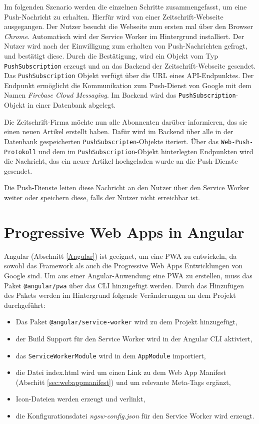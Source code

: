 Im folgenden Szenario werden die einzelnen Schritte zusammengefasst, um eine Push-Nachricht zu erhalten. Hierfür wird von einer Zeitschrift-Webseite ausgegangen. Der Nutzer besucht die Webseite zum ersten mal über den Browser \textit{Chrome}. Automatisch wird der Service Worker im Hintergrund installiert. Der Nutzer wird nach der Einwilligung zum erhalten von Push-Nachrichten gefragt, und bestätigt diese. Durch die Bestätigung, wird ein Objekt vom Typ \texttt{PushSubscription} erzeugt und an das Backend der Zeitschrift-Webseite gesendet. Das \texttt{PushSubscription} Objekt verfügt über die URL eines API-Endpunktes. Der Endpunkt ermöglicht die Kommunikation zum Push-Dienst von Google mit dem Namen \textit{Firebase Cloud Messaging}. 
Im Backend wird das \texttt{PushSubscription}-Objekt in einer Datenbank abgelegt. 

Die Zeitschrift-Firma möchte nun alle Abonnenten darüber informieren, das sie einen neuen Artikel erstellt haben. Dafür wird im Backend über alle in der Datenbank gespeicherten \texttt{PushSubscripten}-Objekte iteriert. Über das \texttt{Web-Push-Protokoll} und dem im \texttt{PushSubscription}-Objekt hinterlegten Endpunkten wird die Nachricht, das ein neuer Artikel hochgeladen wurde an die Push-Dienste gesendet. 

Die Push-Dienste leiten diese Nachricht an den Nutzer über den Service Worker weiter oder speichern diese, falls der Nutzer nicht erreichbar ist. 


\section{Progressive Web Apps in Angular}\label{sec:pwaAngular}

Angular (Abschnitt \ref{Angular}) ist geeignet, um eine PWA zu entwickeln, da sowohl das Framework als auch die Progressive Web Apps Entwicklungen von Google sind. 
Um aus einer Angular-Anwendung eine PWA zu erstellen, muss das Paket \texttt{@angular/pwa} über das \ac{CLI} hinzugefügt werden.
Durch das Hinzufügen des Pakets werden im Hintergrund folgende Veränderungen an dem Projekt durchgeführt: 
\begin{itemize}
    \item Das Paket \texttt{@angular/service-worker} wird zu dem Projekt hinzugefügt,
    \item der Build Support für den Service Worker wird in der Angular CLI aktiviert,
    \item das \texttt{ServiceWorkerModule} wird in dem \texttt{AppModule} importiert,
    \item die Datei index.html wird um einen Link zu dem Web App Manifest (Abschitt \ref{sec:webappmanifest}) und um relevante Meta-Tags ergänzt,
    \item Icon-Dateien werden erzeugt und verlinkt,
    \item die Konfigurationsdatei \textit{ngsw-config.json} für den Service Worker wird erzeugt. 
\end{itemize}

